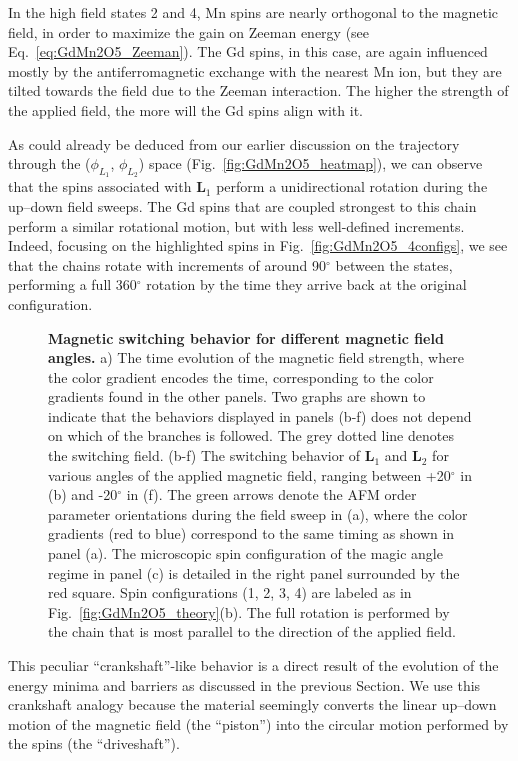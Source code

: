In the high field states 2 and 4, Mn spins are nearly orthogonal to the magnetic field, in order to maximize the gain on Zeeman energy (see Eq.~\eqref{eq:GdMn2O5_Zeeman}).
The Gd spins, in this case, are again influenced mostly by the antiferromagnetic exchange with the nearest Mn ion, but they are tilted towards the field due to the Zeeman interaction.
The higher the strength of the applied field, the more will the Gd spins align with it.

As could already be deduced from our earlier discussion on the trajectory through the ($\phi_{L_1}$, $\phi_{L_2}$) space (Fig.~\ref{fig:GdMn2O5_heatmap}), we can observe that the spins associated with $\bm L_1$ perform a unidirectional rotation during the up--down field sweeps.
The Gd spins that are coupled strongest to this chain perform a similar rotational motion, but with less well-defined increments.
Indeed, focusing on the highlighted spins in Fig.~\ref{fig:GdMn2O5_4configs}, we see that the chains rotate with increments of around 90$^\circ$ between the states, performing a full 360$^\circ$ rotation by the time they arrive back at the original configuration.
\begin{figure}[h!]
	\caption{{\bf Magnetic switching behavior for different magnetic field angles.} a) The time evolution of the magnetic field strength, where the color gradient encodes the time, corresponding to the color gradients found in the other panels. Two graphs are shown to indicate that the behaviors displayed in panels (b-f) does not depend on which of the branches is followed. The grey dotted line denotes the switching field. (b-f) The switching behavior of $\bm L_1$ and $\bm L_2$ for various angles of the applied magnetic field, ranging between +20$^\circ$ in (b) and -20$^\circ$ in (f). The green arrows denote the \gls{AFM} order parameter orientations during the field sweep in (a), where the color gradients (red to blue) correspond to the same timing as shown in panel (a). The microscopic spin configuration of the magic angle regime in panel (c) is detailed in the right panel surrounded by the red square. Spin configurations (1, 2, 3, 4) are labeled as in Fig.~\ref{fig:GdMn2O5_theory}(b). The full rotation is performed by the chain that is most parallel to the direction of the applied field. \label{fig:GdMn2O5_regimes}}  
\end{figure}
This peculiar ``crankshaft''-like behavior is a direct result of the evolution of the energy minima and barriers as discussed in the previous Section.
We use this crankshaft analogy because the material seemingly converts the linear up--down motion of the magnetic field (the ``piston'') into the circular motion performed by the spins (the ``driveshaft'').

